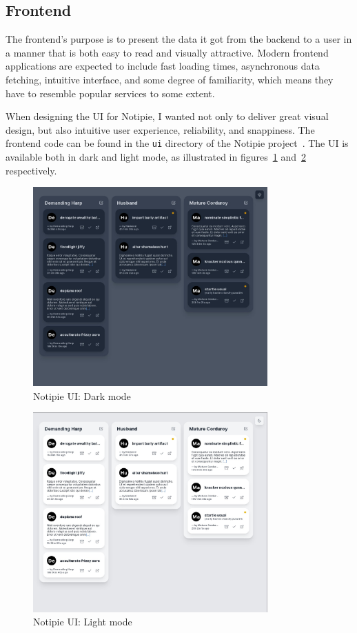 \subsection{Frontend}\label{sec:frontend}

The frontend's purpose is to present the data
it got from the backend to a user
in a manner that is both easy to read
and visually attractive.
Modern frontend applications
are expected to include
fast loading times,
asynchronous data fetching,
intuitive interface,
and some degree of familiarity,
which means they have to resemble
popular services to some extent.

When designing the \ac{UI} for Notipie,
I wanted not only to deliver great visual design,
but also intuitive user experience,
reliability,
and snappiness.
The frontend code
can be found in the
\texttt{ui} directory of the Notipie project~\cite{sewera_notipie_2022-5}.
The \ac{UI} is available both in dark and light mode,
as illustrated in figures~\ref{fig:notipie-ui-dark}
and~\ref{fig:notipie-ui-light} respectively.

\begin{figure}[h]
  \centering
  \includegraphics[width=9cm,keepaspectratio]{img/notipie_dark.jpg}
  \caption{Notipie UI: Dark mode}
  \label{fig:notipie-ui-dark}
\end{figure}

\begin{figure}[h]
  \centering
  \includegraphics[width=9cm,keepaspectratio]{img/notipie_light.jpg}
  \caption{Notipie UI: Light mode}
  \label{fig:notipie-ui-light}
\end{figure}

